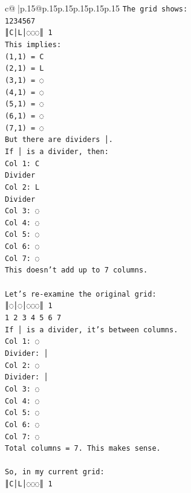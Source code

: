 \documentclass{article}
\begin{document}
{\begin{supertabular}{c@{$\;$}|p{.15\linewidth}@{}p{.15\linewidth}p{.15\linewidth}p{.15\linewidth}p{.15\linewidth}p{.15\linewidth}}
{{{\texttt{The grid shows:} \\
\texttt{1234567} \\
\texttt{║C│L│◌◌◌║ 1} \\
\texttt{This implies:} \\
\texttt{(1,1) = C} \\
\texttt{(2,1) = L} \\
\texttt{(3,1) = ◌} \\
\texttt{(4,1) = ◌} \\
\texttt{(5,1) = ◌} \\
\texttt{(6,1) = ◌} \\
\texttt{(7,1) = ◌} \\
\texttt{But there are dividers │.} \\
\texttt{If │ is a divider, then:} \\
\texttt{Col 1: C} \\
\texttt{Divider} \\
\texttt{Col 2: L} \\
\texttt{Divider} \\
\texttt{Col 3: ◌} \\
\texttt{Col 4: ◌} \\
\texttt{Col 5: ◌} \\
\texttt{Col 6: ◌} \\
\texttt{Col 7: ◌} \\
\texttt{This doesn't add up to 7 columns.} \\
\\ 
\texttt{Let's re{-}examine the original grid:} \\
\texttt{║◌│◌│◌◌◌║ 1} \\
\texttt{1 2 3 4 5 6 7} \\
\texttt{If │ is a divider, it's between columns.} \\
\texttt{Col 1: ◌} \\
\texttt{Divider: │} \\
\texttt{Col 2: ◌} \\
\texttt{Divider: │} \\
\texttt{Col 3: ◌} \\
\texttt{Col 4: ◌} \\
\texttt{Col 5: ◌} \\
\texttt{Col 6: ◌} \\
\texttt{Col 7: ◌} \\
\texttt{Total columns = 7. This makes sense.} \\
\\ 
\texttt{So, in my current grid:} \\
\texttt{║C│L│◌◌◌║ 1} \\
}}}
\end{supertabular}}
\end{document}
